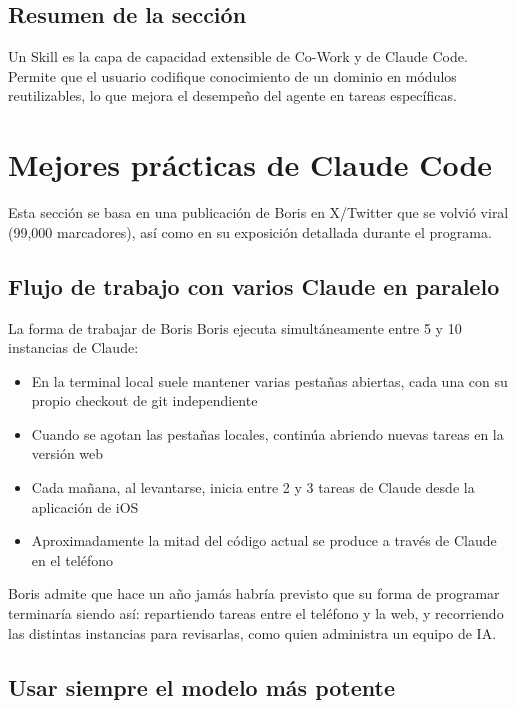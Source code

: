 \documentclass[a4paper]{article}
\begin{document}
\subsection{Resumen de la sección}

Un Skill es la capa de capacidad extensible de Co-Work y de Claude Code. Permite que el usuario codifique conocimiento de un dominio en módulos reutilizables, lo que mejora el desempeño del agente en tareas específicas.

\section{Mejores prácticas de Claude Code}

Esta sección se basa en una publicación de Boris en X/Twitter que se volvió viral (99,000 marcadores), así como en su exposición detallada durante el programa.

\subsection{Flujo de trabajo con varios Claude en paralelo}

\begin{importantbox}{La forma de trabajar de Boris}
Boris ejecuta simultáneamente entre 5 y 10 instancias de Claude:
\begin{itemize}
    \item En la terminal local suele mantener varias pestañas abiertas, cada una con su propio checkout de git independiente
    \item Cuando se agotan las pestañas locales, continúa abriendo nuevas tareas en la versión web
    \item Cada mañana, al levantarse, inicia entre 2 y 3 tareas de Claude desde la aplicación de iOS
    \item Aproximadamente la mitad del código actual se produce a través de Claude en el teléfono
\end{itemize}
\end{importantbox}

Boris admite que hace un año jamás habría previsto que su forma de programar terminaría siendo así: repartiendo tareas entre el teléfono y la web, y recorriendo las distintas instancias para revisarlas, como quien administra un equipo de IA.

\subsection{Usar siempre el modelo más potente}
\end{document}

